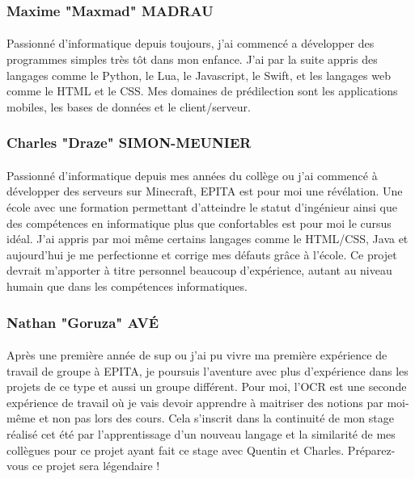\documentclass{article}
\begin{document}
\subsubsection{Maxime "Maxmad" MADRAU}
\paragraph{}Passionné d'informatique depuis toujours, j'ai commencé a développer des programmes simples très tôt dans mon enfance. J'ai par la suite appris des langages comme le Python, le Lua, le Javascript, le Swift, et les langages web comme le HTML et le CSS. Mes domaines de prédilection sont les applications mobiles, les bases de données et le client/serveur.

\subsubsection{Charles "Draze" SIMON-MEUNIER}
\paragraph{}Passionné d'informatique depuis mes années du collège ou j'ai commencé à développer des serveurs sur Minecraft, EPITA est pour moi une révélation. Une école avec une formation permettant d'atteindre le statut d'ingénieur ainsi que des compétences en informatique plus que confortables est pour moi le cursus idéal. J'ai appris par moi même certains langages comme le HTML/CSS, Java et aujourd'hui je me perfectionne et corrige mes défauts grâce à l'école. Ce projet devrait m'apporter à titre personnel beaucoup d'expérience, autant au niveau humain que dans les compétences informatiques.

\subsubsection{Nathan "Goruza" AVÉ}
\paragraph{}Après une première année de sup ou j’ai pu vivre ma première expérience de travail de groupe à EPITA, je poursuis l’aventure avec plus d’expérience dans les projets de ce type et aussi un groupe différent. Pour moi, l’OCR est une seconde expérience de travail où je vais devoir apprendre à maitriser des notions par moi-même et non pas lors des cours. Cela s’inscrit dans la continuité de mon stage réalisé cet été par l’apprentissage d’un nouveau langage et la similarité de mes collègues pour ce projet ayant fait ce stage avec Quentin et Charles. Préparez-vous ce projet sera légendaire !
\end{document}
